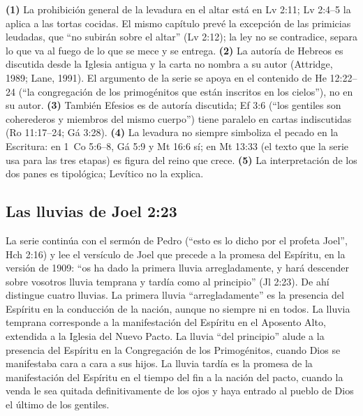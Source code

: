 \documentclass[11pt,letterpaper]{article}
\begin{document}
\begin{nota}
\textbf{(1)} La prohibición general de la levadura en el altar está en Lv 2:11; Lv 2:4--5 la aplica a las tortas cocidas. El mismo capítulo prevé la excepción de las primicias leudadas, que ``no subirán sobre el altar'' (Lv 2:12); la ley no se contradice, separa lo que va al fuego de lo que se mece y se entrega. \textbf{(2)} La autoría de Hebreos es discutida desde la Iglesia antigua y la carta no nombra a su autor (Attridge, 1989; Lane, 1991). El argumento de la serie se apoya en el contenido de He 12:22--24 (``la congregación de los primogénitos que están inscritos en los cielos''), no en su autor. \textbf{(3)} También Efesios es de autoría discutida; Ef 3:6 (``los gentiles son coherederos y miembros del mismo cuerpo'') tiene paralelo en cartas indiscutidas (Ro 11:17--24; Gá 3:28). \textbf{(4)} La levadura no siempre simboliza el pecado en la Escritura: en 1~Co 5:6--8, Gá 5:9 y Mt 16:6 sí; en Mt 13:33 (el texto que la serie usa para las tres etapas) es figura del reino que crece. \textbf{(5)} La interpretación de los dos panes es tipológica; Levítico no la explica.
\end{nota}

\subsection{Las lluvias de Joel 2:23}

La serie continúa con el sermón de Pedro (``esto es lo dicho por el profeta Joel'', Hch 2:16) y lee el versículo de Joel que precede a la promesa del Espíritu, en la versión de 1909: ``os ha dado la primera lluvia arregladamente, y hará descender sobre vosotros lluvia temprana y tardía como al principio'' (Jl 2:23). De ahí distingue cuatro lluvias. La primera lluvia ``arregladamente'' es la presencia del Espíritu en la conducción de la nación, aunque no siempre ni en todos. La lluvia temprana corresponde a la manifestación del Espíritu en el Aposento Alto, extendida a la Iglesia del Nuevo Pacto. La lluvia ``del principio'' alude a la presencia del Espíritu en la Congregación de los Primogénitos, cuando Dios se manifestaba cara a cara a sus hijos. La lluvia tardía es la promesa de la manifestación del Espíritu en el tiempo del fin a la nación del pacto, cuando la venda le sea quitada definitivamente de los ojos y haya entrado al pueblo de Dios el último de los gentiles.
\end{document}
